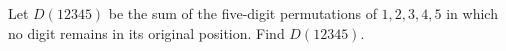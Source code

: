 Let $D(12345)$ be the sum of the five-digit permutations of $1,2,3,4,5$ in which no digit remains in its original position. Find $D(12345)$.
